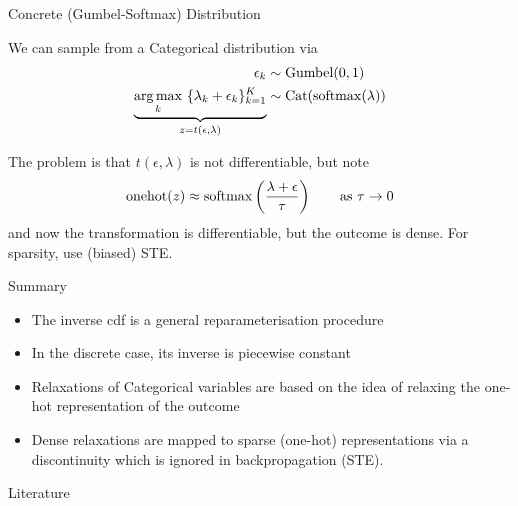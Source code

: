\begin{frame}{Concrete (Gumbel-Softmax) Distribution}

	We can sample from a Categorical distribution via
	\begin{equation*}
	\begin{aligned}
		\epsilon_k &\sim \operatorname{Gumbel}(0, 1) \\
		\underbrace{\operatorname*{arg\,max}_k ~ \{\lambda_k + \epsilon_k\}_{k=1}^K }_{z=t(\epsilon, \lambda)} &\sim \operatorname{Cat}(\operatorname{softmax}(\lambda)) \\		
	\end{aligned}
	\end{equation*}
	
	\pause
	
	The problem is that $t(\epsilon, \lambda)$ is not differentiable, but note 	
	\begin{equation*}
		\operatorname{onehot}(z) \approx \operatorname{softmax}\left(\frac{\lambda + \epsilon}{\tau}\right)  \qquad \text{as } \tau \to 0
	\end{equation*}
	and now the transformation is differentiable, but the outcome is dense. For sparsity, use (biased) STE.
	
	
\end{frame}

\begin{frame}{Summary}

	\begin{itemize}
		\item The inverse cdf is a general reparameterisation procedure
		\item In the discrete case, its inverse is piecewise constant
		\item Relaxations of Categorical variables are based on the idea of relaxing the one-hot representation of the outcome
		\item Dense relaxations are mapped to sparse (one-hot) representations via a discontinuity which is ignored in backpropagation (STE).
	\end{itemize}
\end{frame}

\nocite{bengio2013estimating}
\nocite{MaddisonEtAl2017:Concrete}
\nocite{JangEtAl2017:GumbelSoftmax}
\nocite{rolfe2016discrete}
\nocite{louizos2017learning}
\nocite{bastings-etal-2019-interpretable}

\begin{frame}[allowframebreaks]{Literature}
%


\end{frame}

